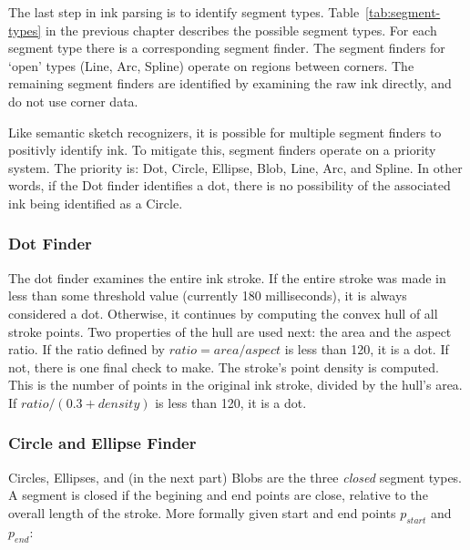 \begin{samepage}
\begin{samepage}
The last step in ink parsing is to identify segment
types. Table~\ref{tab:segment-types} in the previous chapter describes
the possible segment types. For each segment type there is a
corresponding segment finder. The segment finders for `open' types
(Line, Arc, Spline) operate on regions between corners. The remaining
segment finders are identified by examining the raw ink directly, and
do not use corner data.

Like semantic sketch recognizers, it is possible for multiple segment
finders to positivly identify ink. To mitigate this, segment finders
operate on a priority system. The priority is: Dot, Circle, Ellipse,
Blob, Line, Arc, and Spline. In other words, if the Dot finder
identifies a dot, there is no possibility of the associated ink being
identified as a Circle.

\subsubsection{Dot Finder}

The dot finder examines the entire ink stroke. If the entire stroke
was made in less than some threshold value (currently 180
milliseconds), it is always considered a dot. Otherwise, it continues
by computing the convex hull of all stroke points. Two properties of
the hull are used next: the area and the aspect ratio. If the ratio
defined by $ratio = area/aspect$ is less than 120, it is a dot. If
not, there is one final check to make. The stroke's point density is
computed. This is the number of points in the original ink stroke,
divided by the hull's area. If $ratio/(0.3 + density)$ is less than
120, it is a dot.


\subsubsection{Circle and Ellipse Finder}

Circles, Ellipses, and (in the next part) Blobs are the three
\textit{closed} segment types. A segment is closed if the begining and
end points are close, relative to the overall length of the
stroke. More formally given start and end points $p_{start}$ and
$p_{end}$:


\end{samepage}
\end{samepage}
